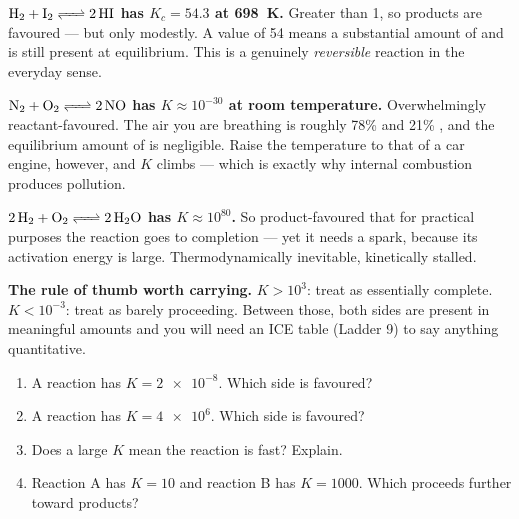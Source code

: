 \documentclass{apchem-worksheet}
\begin{document}
\begin{workedexample}
\textbf{$\ce{H2 + I2 <=> 2HI}$ has $K_{c} = 54.3$ at
\SI{698}{\kelvin}.} Greater than 1, so products are favoured --- but
only modestly. A value of 54 means a substantial amount of  and
 is still present at equilibrium. This is a genuinely
\emph{reversible} reaction in the everyday sense.

\textbf{$\ce{N2 + O2 <=> 2NO}$ has $K \approx 10^{-30}$ at room
temperature.} Overwhelmingly reactant-favoured. The air you are
breathing is roughly 78\%  and 21\% , and the equilibrium
amount of  is negligible. Raise the temperature to that of a car
engine, however, and $K$ climbs --- which is exactly why internal
combustion produces  pollution.

\textbf{$\ce{2H2 + O2 <=> 2H2O}$ has $K \approx 10^{80}$.} So
product-favoured that for practical purposes the reaction goes to
completion --- yet it needs a spark, because its activation energy is
large. Thermodynamically inevitable, kinetically stalled.

\textbf{The rule of thumb worth carrying.} $K > 10^{3}$: treat as
essentially complete. $K < 10^{-3}$: treat as barely proceeding.
Between those, both sides are present in meaningful amounts and you
will need an ICE table (Ladder 9) to say anything quantitative.
\end{workedexample}

\begin{yourturn}
\begin{enumerate}[leftmargin=*,itemsep=0.5em]
  \item A reaction has $K = \num{2e-8}$. Which side is favoured?
        \workspace[1.4cm]
  \item A reaction has $K = \num{4e6}$. Which side is favoured?
        \workspace[1.4cm]
  \item Does a large $K$ mean the reaction is fast? Explain.
        \workspace[1.8cm]
  \item Reaction A has $K = 10$ and reaction B has $K = 1000$. Which
        proceeds further toward products? \workspace[1.6cm]
\end{enumerate}
\end{yourturn}
\end{document}
